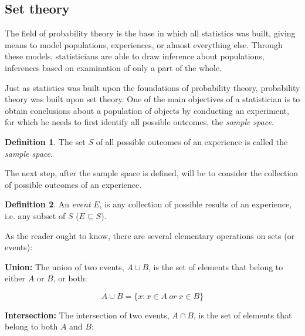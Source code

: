 \documentclass[
  oneside,
  11pt, a4paper,
  footinclude=true,
  headinclude=true,
  cleardoublepage=empty
]{scrbook}
\theoremstyle{definition}
\newtheorem{definition}{Definition}[section]
\theoremstyle{definition}
\begin{document}
        \subsection{Set theory}
        
            The field of probability theory is the base in which all statistics was built, giving means to model populations, experiences, or almost everything else. Through these models, statisticians are able to draw inference about populations, inferences based on examination of only a part of the whole.
            
            Just as statistics was built upon the foundations of probability theory, probability theory was built upon set theory. One of the main objectives of a statistician is to obtain conclusions about a population of objects by conducting an experiment, for which he needs to first identify all possible outcomes, the \emph{sample space}.
            
            \begin{definition}{}
                The set $S$ of all possible outcomes of an experience is called the \emph{sample space}.
            \end{definition}
            
            The next step, after the sample space is defined, will be to consider the collection of possible outcomes of an experience.
            
            \begin{definition}{}
                An \emph{event} $E$, is any collection of possible results of an experience, i.e. any subset of $S$ ($E \subseteq S$).
            \end{definition}
            
            As the reader ought to know, there are several elementary operations on sets (or events):
            
            \vskip0.2cm
            \textbf{Union:} The union of two events, $A \cup B$, is the set of elements that belong to either $A$ or $B$, or both:
            
            \begin{equation}
                A \cup B = \{x : x \in A\ or\ x \in B\}
            \end{equation}{}
            
            \textbf{Intersection:} The intersection of two events, $A \cap B$, is the set of elements that belong to both $A$ and $B$:
            
\end{document}
